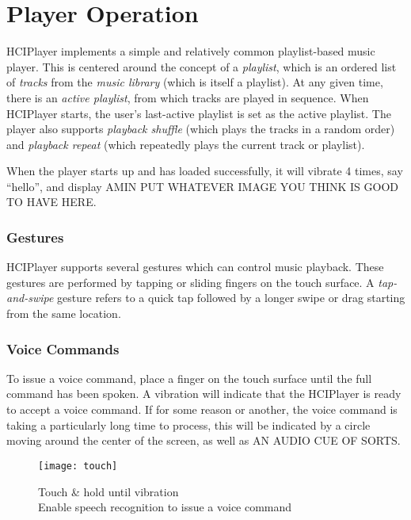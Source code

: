 \documentclass[12pt,letterpaper]{article}
\begin{document}
\section{Player Operation}
	
HCIPlayer implements a simple and relatively common playlist-based music player. This is centered around the concept of a \emph{playlist}, which is an ordered list of \emph{tracks} from the \emph{music library} (which is itself a playlist). At any given time, there is an \emph{active playlist}, from which tracks are played in sequence. When HCIPlayer starts, the user's last-active playlist is set as the active playlist. The player also supports \emph{playback shuffle} (which plays the tracks in a random order) and \emph{playback repeat} (which repeatedly plays the current track or playlist).

When the player starts up and has loaded successfully, it will vibrate 4 times, {\color{magenta} say ``hello''}, and display {\color{red}AMIN PUT WHATEVER IMAGE YOU THINK IS GOOD TO HAVE HERE}.


\subsubsection*{Gestures}
HCIPlayer supports several gestures which can control music playback. These gestures are performed by tapping or sliding fingers on the touch surface. A \emph{tap-and-swipe} gesture refers to a quick tap followed by a longer swipe or drag starting from the same location.
\subsubsection*{Voice Commands}
To issue a voice command, place a finger on the touch surface until the full command has been spoken. A vibration will indicate that the HCIPlayer is ready to accept a voice command. If for some reason or another, the voice command is taking a particularly long time to process, {\color{magenta}this will be indicated by a circle moving around the center of the screen}, as well as {\color{red}AN AUDIO CUE OF SORTS}.

\begin{figure}[H]
	\centering
	\texttt{[image: touch]}
	\caption{Touch \& hold until vibration \\ Enable speech recognition to issue a voice command}
\end{figure}
\end{document}
